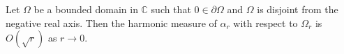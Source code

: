 
Let $\Omega$ be a bounded domain in $\mathbb{C}$ such that $0 \in \partial \Omega$ and $\Omega$ is disjoint from the negative real axis. Then the harmonic measure of $\alpha_r$ with respect to $\Omega_r$ is $O(\sqrt{r})$ as $r \to 0$.
